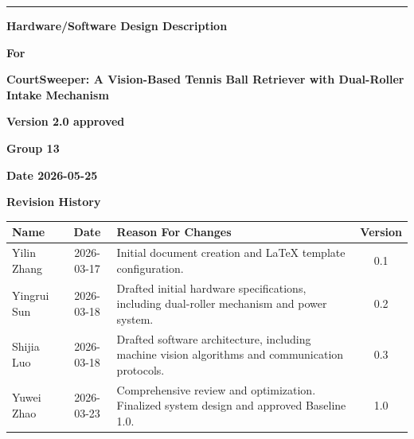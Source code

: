 \documentclass[12pt,a4paper]{article}
\begin{document}
\begin{titlepage}
\raggedleft
\rule{\linewidth}{3pt}

\vspace{1.5cm}

{\LARGE\bfseries Hardware/Software Design Description\par}

\vspace{1.5cm}

{\Large\bfseries For\par}

\vspace{1.5cm}

{\Huge\bfseries CourtSweeper: A Vision-Based Tennis Ball Retriever with Dual-Roller Intake Mechanism \par}

\vspace{1.5cm}

{\bfseries Version 2.0 approved} \\ [0.8cm]

\vspace{1.5cm}

{\bfseries Group 13} \\ [0.8cm]

\vspace{1.5cm}

{\bfseries Date 2026-05-25} \\ [3cm]
\end{titlepage}

\thispagestyle{nofooter}

\begin{center}
  \Large\bfseries
  Revision History
\end{center}

\begin{tabularx}{0.9\textwidth}{|X|c|X|c|}
  \hline
  \rowcolor[RGB]{180,180,180}
  \textbf{Name} & \textbf{Date} & \textbf{Reason For Changes} & \textbf{Version} \\ \hline

  Yilin Zhang & 2026-03-17 & Initial document creation and LaTeX template configuration. & 0.1 \\ \hline
  Yingrui Sun & 2026-03-18 & Drafted initial hardware specifications, including dual-roller mechanism and power system. & 0.2 \\ \hline
  Shijia Luo & 2026-03-18 & Drafted software architecture, including machine vision algorithms and communication protocols. & 0.3 \\ \hline
  Yuwei Zhao & 2026-03-23 & Comprehensive review and optimization. Finalized system design and approved Baseline 1.0. & 1.0 \\ \hline
\end{tabularx}
\end{document}
